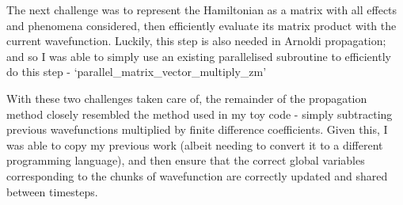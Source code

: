 The next challenge was to represent the Hamiltonian as a matrix with all effects and phenomena considered, then efficiently evaluate its matrix product with the current wavefunction. Luckily, this step is also needed in Arnoldi propagation; and so I was able to simply use an existing parallelised subroutine to efficiently do this step - `parallel\_matrix\_vector\_multiply\_zm' 

With these two challenges taken care of, the remainder of the propagation method closely resembled the method used in my toy code - simply subtracting previous wavefunctions multiplied by finite difference coefficients. Given this, I was able to copy my previous work (albeit needing to convert it to a different programming language), and then ensure that the correct global variables corresponding to the chunks of wavefunction are correctly updated and shared between timesteps.



